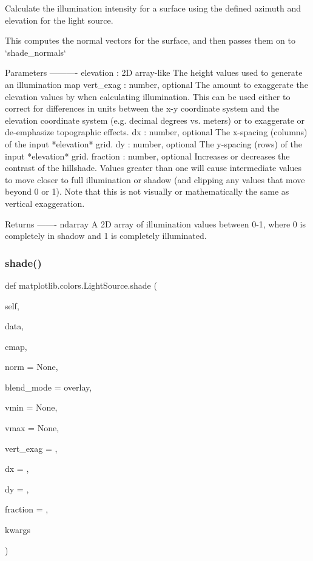 \begin{DoxyVerb}Calculate the illumination intensity for a surface using the defined
azimuth and elevation for the light source.

This computes the normal vectors for the surface, and then passes them
on to `shade_normals`

Parameters
----------
elevation : 2D array-like
    The height values used to generate an illumination map
vert_exag : number, optional
    The amount to exaggerate the elevation values by when calculating
    illumination. This can be used either to correct for differences in
    units between the x-y coordinate system and the elevation
    coordinate system (e.g. decimal degrees vs. meters) or to
    exaggerate or de-emphasize topographic effects.
dx : number, optional
    The x-spacing (columns) of the input *elevation* grid.
dy : number, optional
    The y-spacing (rows) of the input *elevation* grid.
fraction : number, optional
    Increases or decreases the contrast of the hillshade.  Values
    greater than one will cause intermediate values to move closer to
    full illumination or shadow (and clipping any values that move
    beyond 0 or 1). Note that this is not visually or mathematically
    the same as vertical exaggeration.

Returns
-------
ndarray
    A 2D array of illumination values between 0-1, where 0 is
    completely in shadow and 1 is completely illuminated.
\end{DoxyVerb}
 \mbox{\label{classmatplotlib_1_1colors_1_1LightSource_afb47b7b28c92dd87ec518dd671863e20}} 
\subsubsection{\texorpdfstring{shade()}{shade()}}
{\footnotesize\ttfamily def matplotlib.\+colors.\+Light\+Source.\+shade (\begin{DoxyParamCaption}\item[{}]{self,  }\item[{}]{data,  }\item[{}]{cmap,  }\item[{}]{norm = {\ttfamily None},  }\item[{}]{blend\+\_\+mode = {\ttfamily \textquotesingle{}overlay\textquotesingle{}},  }\item[{}]{vmin = {\ttfamily None},  }\item[{}]{vmax = {\ttfamily None},  }\item[{}]{vert\+\_\+exag = {},  }\item[{}]{dx = {},  }\item[{}]{dy = {},  }\item[{}]{fraction = {},  }\item[{}]{kwargs }\end{DoxyParamCaption})}

